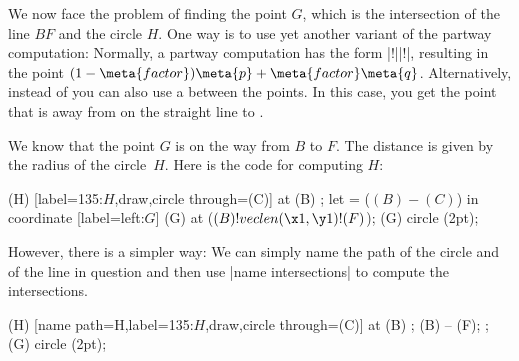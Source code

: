 We now face the problem of finding the point $G$, which is the intersection of
the line $BF$ and the circle $H$. One way is to use yet another variant of the
partway computation: Normally, a partway computation has the form
|!||!|, resulting in the point
$(1-\meta{factor})\meta{p} + \meta{factor}\meta{q}$. Alternatively, instead of
 you can also use a  between the points. In this
case, you get the point that is  away from  on the
straight line to .

We know that the point $G$ is on the way from $B$ to $F$. The distance is given
by the radius of the circle~$H$. Here is the code for computing $H$:
%
{\ifpgfmanualexternalize\tikzexternaldisable\fi
\begin{codeexample}[
    preamble={\usetikzlibrary{calc,through}},
    pre={\begin{tikzpicture}
  \coordinate [label=left:$A$]  (A) at (0,0);
  \coordinate [label=right:$B$] (B) at (0.75,0.25);
  \coordinate [label=above:$C$] (C) at (1,1.5);
  \draw (A) -- (B) -- (C);
  \coordinate [label=above:$D$] (D) at
    ($ (A) ! .5 ! (B) ! {sin(60)*2} ! 90:(B) $) {};
  \draw (D) -- ($ (D) ! 3.5 ! (B) $) coordinate [label=below:$F$] (F);
  \draw (D) -- ($ (D) ! 2.5 ! (A) $) coordinate [label=below:$E$] (E);},
    post={\end{tikzpicture}},
]
  \node (H) [label=135:$H$,draw,circle through=(C)] at (B) {};
  \path let  = ($ (B) - (C) $) in
    coordinate [label=left:$G$] (G) at ($ (B) ! veclen(\x1,\y1) ! (F) $);
  \fill[red,opacity=.5] (G) circle (2pt);
\end{codeexample}

However, there is a simpler way: We can simply name the path of the circle and
of the line in question and then use |name intersections| to compute the
intersections.
%
\begin{codeexample}[
    preamble={\usetikzlibrary{calc,intersections,through}},
    pre={\begin{tikzpicture}
  \coordinate [label=left:$A$]  (A) at (0,0);
  \coordinate [label=right:$B$] (B) at (0.75,0.25);
  \coordinate [label=above:$C$] (C) at (1,1.5);
  \draw (A) -- (B) -- (C);
  \coordinate [label=above:$D$] (D) at
    ($ (A) ! .5 ! (B) ! {sin(60)*2} ! 90:(B) $) {};
  \draw (D) -- ($ (D) ! 3.5 ! (B) $) coordinate [label=below:$F$] (F);
  \draw (D) -- ($ (D) ! 2.5 ! (A) $) coordinate [label=below:$E$] (E);},
    post={\end{tikzpicture}},
]
  \node (H) [name path=H,label=135:$H$,draw,circle through=(C)] at (B) {};
  \path [name path=B--F] (B) -- (F);
  \path [name intersections={of=H and B--F,by={[label=left:$G$]G}}];
  \fill[red,opacity=.5] (G) circle (2pt);
\end{codeexample}
}%


